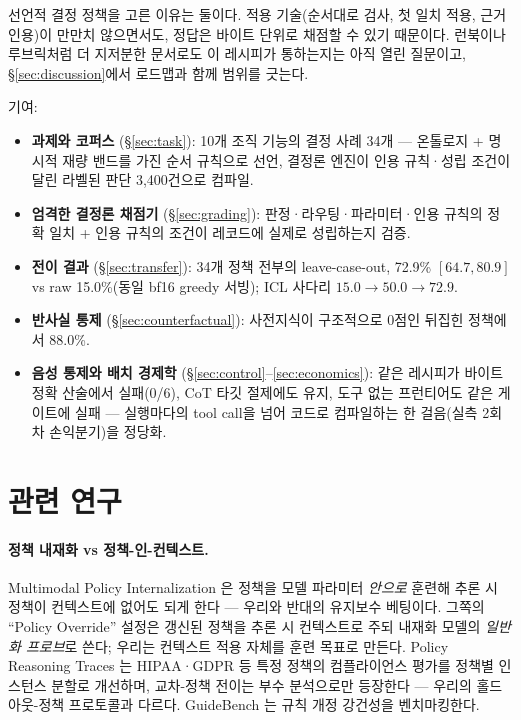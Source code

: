\documentclass[11pt]{article}
\begin{document}
선언적 결정 정책을 고른 이유는 둘이다. 적용 기술(순서대로 검사, 첫 일치 적용, 근거 인용)이 만만치 않으면서도, 정답은 바이트 단위로 채점할 수 있기 때문이다. 런북이나 루브릭처럼 더 지저분한 문서로도 이 레시피가 통하는지는 아직 열린 질문이고, \S\ref{sec:discussion}에서 로드맵과 함께 범위를 긋는다.

기여:
\begin{itemize}
  \item \textbf{과제와 코퍼스} (\S\ref{sec:task}): 10개 조직 기능의 결정 사례 34개 --- 온톨로지 + 명시적 재량 밴드를 가진 순서 규칙으로 선언, 결정론 엔진이 인용 규칙·성립 조건이 달린 라벨된 판단 3{,}400건으로 컴파일.
  \item \textbf{엄격한 결정론 채점기} (\S\ref{sec:grading}): 판정·라우팅·파라미터·인용 규칙의 정확 일치 + 인용 규칙의 조건이 레코드에 실제로 성립하는지 검증.
  \item \textbf{전이 결과} (\S\ref{sec:transfer}): 34개 정책 전부의 leave-case-out, 72.9\% $[64.7, 80.9]$ vs raw 15.0\%(동일 bf16 greedy 서빙); ICL 사다리 $15.0 \rightarrow 50.0 \rightarrow 72.9$.
  \item \textbf{반사실 통제} (\S\ref{sec:counterfactual}): 사전지식이 구조적으로 0점인 뒤집힌 정책에서 88.0\%.
  \item \textbf{음성 통제와 배치 경제학} (\S\ref{sec:control}--\ref{sec:economics}): 같은 레시피가 바이트 정확 산술에서 실패(0/6), CoT 타깃 절제에도 유지, 도구 없는 프런티어도 같은 게이트에 실패 --- 실행마다의 tool call을 넘어 코드로 컴파일하는 한 걸음(실측 2회차 손익분기)을 정당화.
\end{itemize}

\section{관련 연구}

\paragraph{정책 내재화 vs 정책-인-컨텍스트.} Multimodal Policy Internalization \citep{trimpi2025}은 정책을 모델 파라미터 \emph{안으로} 훈련해 추론 시 정책이 컨텍스트에 없어도 되게 한다 --- 우리와 반대의 유지보수 베팅이다. 그쪽의 ``Policy Override'' 설정은 갱신된 정책을 추론 시 컨텍스트로 주되 내재화 모델의 \emph{일반화 프로브}로 쓴다; 우리는 컨텍스트 적용 자체를 훈련 목표로 만든다. Policy Reasoning Traces \citep{prt2025}는 HIPAA·GDPR 등 특정 정책의 컴플라이언스 평가를 정책별 인스턴스 분할로 개선하며, 교차-정책 전이는 부수 분석으로만 등장한다 --- 우리의 홀드아웃-정책 프로토콜과 다르다. GuideBench \citep{guidebench2025}는 규칙 개정 강건성을 벤치마킹한다.
\end{document}
